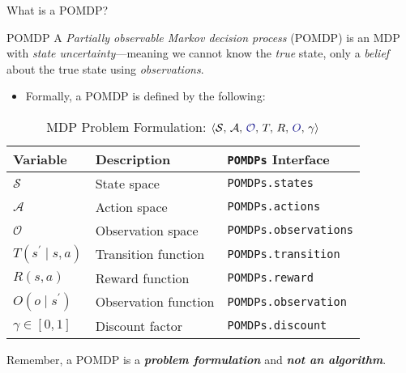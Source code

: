 \begin{frame}[fragile]{What is a POMDP?}

{\footnotesize
\begin{definitionblock}{POMDP}
    A \textit{Partially observable Markov decision process} (POMDP) is an MDP with \textit{state uncertainty}---meaning we cannot know the \textit{true} state, only a \textit{belief} about the true state using \textit{observations}.
\end{definitionblock}
}

\phantom{}

\begin{itemize}
    \item Formally, a POMDP is defined by the following:
\end{itemize}
\begin{table}[!t]
    {\scriptsize
    \centering
    \caption{\label{tab:solutions} MDP Problem Formulation: $\langle \mathcal{S},\, \mathcal{A},\, {\color{darkblue}\mathcal{O}},\, T,\, R,\, {\color{darkblue}O},\, \gamma \rangle$}
    \begin{threeparttable}
    \begin{tabular}{lll}
        \toprule
        \textbf{Variable} & \textbf{Description} & \textbf{\texttt{POMDPs} Interface} \\
        \midrule
        $\mathcal{S}$ & State space & \texttt{POMDPs.states} \\
        $\mathcal{A}$ & Action space & \texttt{POMDPs.actions} \\
        $\mathcal{O}$ & Observation space & \texttt{POMDPs.observations} \\
        $T(s^\prime \mid s,a)$ & Transition function & \texttt{POMDPs.transition} \\
        $R(s,a)$ & Reward function & \texttt{POMDPs.reward} \\
        $O(o \mid s^\prime)$ & Observation function & \texttt{POMDPs.observation} \\
        $\gamma \in [0,1]$ & Discount factor & \texttt{POMDPs.discount} \\
        \bottomrule
    \end{tabular}
    \end{threeparttable}
    }
\end{table}

\begin{importantblock}
    {\tiny
    \begin{center}
    Remember, a POMDP is a \textit{\textbf{problem formulation}} and \textit{\textbf{not an algorithm}}.
    \end{center}
    }
\end{importantblock}

\end{frame}

